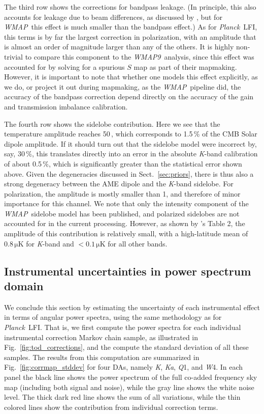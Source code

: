 \documentclass[twocolumn]{../../common/aa}
\def\WMAP{\emph{WMAP}}
\def\WMAPnine{\emph{WMAP9}}
\def\Planck{\emph{Planck}}
\newcommand{\K}[0]{\textit K}
\newcommand{\Ka}[0]{\textit{Ka}}
\newcommand{\Q}[0]{\textit Q}
\newcommand{\W}[0]{\textit W}
\begin{document}
The third row shows the corrections for bandpass leakage. (In principle, this also accounts for leakage due to beam differences, as discussed by \citet{bp09}, but for \WMAP\ this effect is much smaller than the bandpass effect.) As for \Planck\ LFI, this terms is by far the largest correction in polarization, with an amplitude that is almost an order of magnitude larger than any of the others. It is highly non-trivial to compare this component to the \WMAPnine\ analysis, since this effect was accounted for by solving for a spurious $S$ map as part of their mapmaking. However, it is important to note that whether one models this effect explicitly, as we do, or project it out during mapmaking, as the \WMAP\ pipeline did, the accuracy of the bandpass correction depend directly on the accuracy of the gain and transmission imbalance calibration.

The fourth row shows the sidelobe contribution. Here we see that the temperature amplitude reaches 50\,\muK, which corresponds to 1.5\,\% of the CMB Solar dipole amplitude. If it should turn out that the sidelobe model were incorrect by, say, 30\,\%, this translates directly into an error in the absolute \K-band calibration of about 0.5\,\%, which is significantly greater than the statistical error shown above. Given the degeneracies discussed in Sect.~\ref{sec:priors}, there is thus also a strong degeneracy between the AME dipole and the \K-band sidelobe. For polarization, the amplitude is mostly smaller than 1\muK, and therefore of minor importance for this channel. We note that only the intensity component of the \WMAP\ sidelobe model has been published, and polarized sidelobes are not accounted for in the current processing. However, as shown by \citet{barnes2003}'s Table 2, the amplitude of this contribution is relatively small, with a high-latitude mean of $0.8\,\mathrm{\mu K}$ for \K-band and $<0.1\,\mathrm{\mu K}$ for all other bands.




\subsection{Instrumental uncertainties in power spectrum domain }

We conclude this section by estimating the uncertainty of each instrumental effect in terms of angular power spectra, using the same methodology as \citet{bp10} for \Planck\ LFI. That is, we first compute the power spectra for each individual instrumental correction Markov chain sample, as illustrated in Fig.~\ref{fig:tod_corrections}, and the compute the standard deviation of all these samples. The results from this computation are summarized in Fig.~\ref{fig:corrmap_stddev} for four DAs, namely \K, \Ka, \Q1, and \W4. In each panel the black line shows the power spectrum of the full co-added frequency sky map (including both signal and noise), while the gray line shows the white noise level. The thick dark red line shows the sum of all variations, while the thin colored lines show the contribution from individual correction terms.
\end{document}
